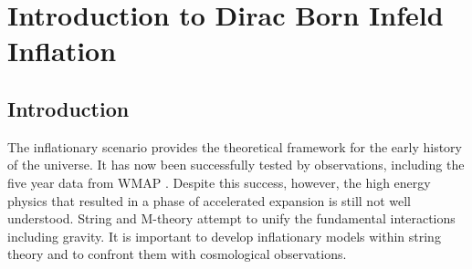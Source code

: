 \renewcommand{\CVSrevision}{\version$Id: dbi-intro.tex,v 1.44 2009/09/24 15:16:51 ith Exp $}
\chapter{Introduction to Dirac Born Infeld Inflation}
\label{ch:dbi-intro}

\section{Introduction}
% 
\label{sec:dbi-intro}


The inflationary scenario provides the 
theoretical framework for the early history 
of the universe. It has now been successfully tested by observations, 
including the five year data from WMAP
\cite{Komatsu:2008hk}. Despite this success, however, the high energy 
physics that resulted in a phase of accelerated expansion is still 
not well understood. String and M-theory attempt to unify the fundamental
interactions 
including gravity. It is important to 
develop inflationary models within string theory and to confront them with 
cosmological observations. 
 

